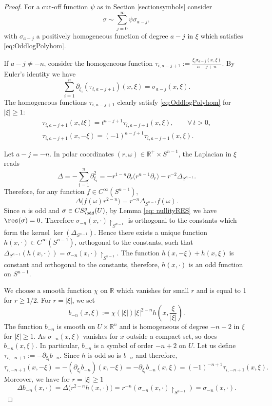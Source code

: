 \begin{proof}
For a cut-of\/f function $\psi$ as in Section \ref{sectionsymbols} consider
\[
\sigma\sim\sum_{j=0}^\infty\psi \sigma_{a-j},
\]
with $\sigma_{a-j}$ a positively homogeneous function of degree $a-j$ in $\xi$ which satisf\/ies \eqref{eq:OddlogPolyhom}.

 If $a-j\not=-n$, consider the homogeneous function $\tau_{i,a-j+1}:=\frac{\xi_i\sigma_{a-j}(x,\xi)}{a-j+n}$. By Euler's identity we have
\[
\sum_{i=1}^n\partial_{\xi_i}(\tau_{i,a-j+1})(x,\xi)=\sigma_{a-j}(x,\xi).
\]
The homogeneous functions $\tau_{i,a-j+1}$ clearly satisfy \eqref{eq:OddlogPolyhom} for $|\xi|\geq1$:
\begin{gather*}
\tau_{i,a-j+1}(x,t\xi) =t^{a-j+1}\tau_{i,a-j+1}(x,\xi),\qquad \forall\, t>0,\\
\tau_{i,a-j+1}(x,-\xi) =(-1)^{a-j+1}\tau_{i,a-j+1}(x,\xi).
\end{gather*}

 Let $a-j=-n$. In polar coordinates $(r,\omega)\in\mathbb{R}^+\times S^{n-1}$, the Laplacian in $\xi$ reads
\[
\Delta=-\sum_{i=1}^n\partial_{\xi_i}^2=-r^{1-n}\partial_r\big(r^{n-1}\partial_r\big)-r^{-2}\Delta_{S^{n-1}}.
\]
Therefore, for any function $f\in C^\infty(S^{n-1})$,
\[
\Delta\big(f(\omega)r^{2-n}\big)=r^{-n}\Delta_{S^{n-1}}f(\omega).
\]
Since $n$ is odd and $\sigma\in CS_{\odd}^a(U)$, by Lemma \ref{eq: nullityRES} we have $\res(\sigma)=0$. Therefore $\sigma_{-n}(x,\cdot)\upharpoonright_{S^{n-1}}$ is orthogonal to the constants which form the kernel $\ker(\Delta_{S^{n-1}})$. Hence there exists a unique function $h(x,\cdot)\in C^\infty(S^{n-1})$, orthogonal to the constants, such that $\Delta_{S^{n-1}}(h(x,\cdot))=\sigma_{-n}(x,\cdot)\upharpoonright_{S^{n-1}}$. The function $h(x,-\xi)+h(x,\xi)$ is constant and orthogonal to the constants, therefore, $h(x,\cdot)$ is an odd function on $S^{n-1}$.

 We choose a smooth function $\chi$ on $\mathbb{R}$ which vanishes for small $r$ and is equal to 1 for $r\geq1/2$. For $r=|\xi|$, we set
\[
b_{-n}(x,\xi):=\chi(|\xi|)|\xi|^{2-n}h\left(x,\frac{\xi}{|\xi|}\right).
\]
The function $b_{-n}$ is smooth on $U\times\mathbb{R}^n$ and is homogeneous of degree $-n+2$ in $\xi$ for $|\xi|\geq1$. As $\sigma_{-n}(x,\xi)$ vanishes for $x$ outside a compact set, so does $b_{-n}(x,\xi)$. In particular, $b_{-n}$ is a symbol of order $-n+2$ on $U$. Let us def\/ine $\tau_{i,-n+1}:=-\partial_{\xi_i}b_{-n}$. Since $h$ is odd so is $b_{-n}$ and therefore,
\[
\tau_{i,-n+1}(x,-\xi)=-(\partial_{\xi_i}b_{-n})(x,-\xi)
=-\partial_{\xi_i}b_{-n}(x,\xi)
=(-1)^{-n+1}\tau_{i,-n+1}(x,\xi).
\]
Moreover, we have for $r=|\xi|\geq1$
\[
\Delta b_{-n}(x,\cdot)=\Delta\big(r^{2-n}h(x,\cdot)\big)=r^{-n}\left(\sigma_{-n}(x,\cdot)\upharpoonright_{S^{n-1}}\right)=\sigma_{-n}(x,\cdot).
\]



\end{proof}
